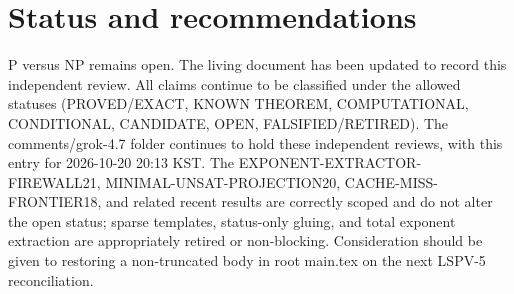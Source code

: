 \documentclass[11pt]{article}
\begin{document}
\section{Status and recommendations}
P versus NP remains open. The living document has been updated to record this independent review. All claims continue to be classified under the allowed statuses (PROVED/EXACT, KNOWN THEOREM, COMPUTATIONAL, CONDITIONAL, CANDIDATE, OPEN, FALSIFIED/RETIRED). The comments/grok-4.7 folder continues to hold these independent reviews, with this entry for 2026-10-20 20:13 KST. The EXPONENT-EXTRACTOR-FIREWALL21, MINIMAL-UNSAT-PROJECTION20, CACHE-MISS-FRONTIER18, and related recent results are correctly scoped and do not alter the open status; sparse templates, status-only gluing, and total exponent extraction are appropriately retired or non-blocking. Consideration should be given to restoring a non-truncated body in root main.tex on the next LSPV-5 reconciliation.

\end{document}
